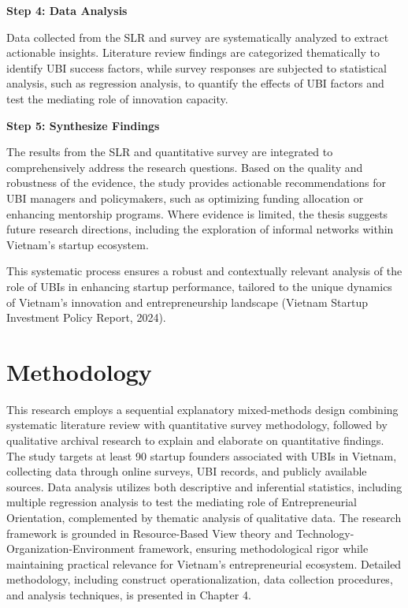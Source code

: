 \documentclass[../Main.tex]{subfiles}
\begin{document}
	\begin{center}
		\begin{minipage}[c]{\textwidth}
		\vspace*{\fill}

	\textbf{Step 4: Data Analysis}

	Data collected from the SLR and survey are systematically analyzed to extract actionable insights. Literature review findings are categorized thematically to identify UBI success factors, while survey responses are subjected to statistical analysis, such as regression analysis, to quantify the effects of UBI factors and test the mediating role of innovation capacity.

	\textbf{Step 5: Synthesize Findings}

	The results from the SLR and quantitative survey are integrated to comprehensively address the research questions. Based on the quality and robustness of the evidence, the study provides actionable recommendations for UBI managers and policymakers, such as optimizing funding allocation or enhancing mentorship programs. Where evidence is limited, the thesis suggests future research directions, including the exploration of informal networks within Vietnam's startup ecosystem.

	This systematic process ensures a robust and contextually relevant analysis of the role of UBIs in enhancing startup performance, tailored to the unique dynamics of Vietnam's innovation and entrepreneurship landscape (Vietnam Startup Investment Policy Report, 2024).

		\end{minipage}
	\end{center}

	\section{Methodology}
	\label{section:1.5_Methodology}
	
	This research employs a sequential explanatory mixed-methods design combining systematic literature review with quantitative survey methodology, followed by qualitative archival research to explain and elaborate on quantitative findings. The study targets at least 90 startup founders associated with UBIs in Vietnam, collecting data through online surveys, UBI records, and publicly available sources. Data analysis utilizes both descriptive and inferential statistics, including multiple regression analysis to test the mediating role of Entrepreneurial Orientation, complemented by thematic analysis of qualitative data. The research framework is grounded in Resource-Based View theory and Technology-Organization-Environment framework, ensuring methodological rigor while maintaining practical relevance for Vietnam's entrepreneurial ecosystem. Detailed methodology, including construct operationalization, data collection procedures, and analysis techniques, is presented in Chapter 4.
\end{document}
